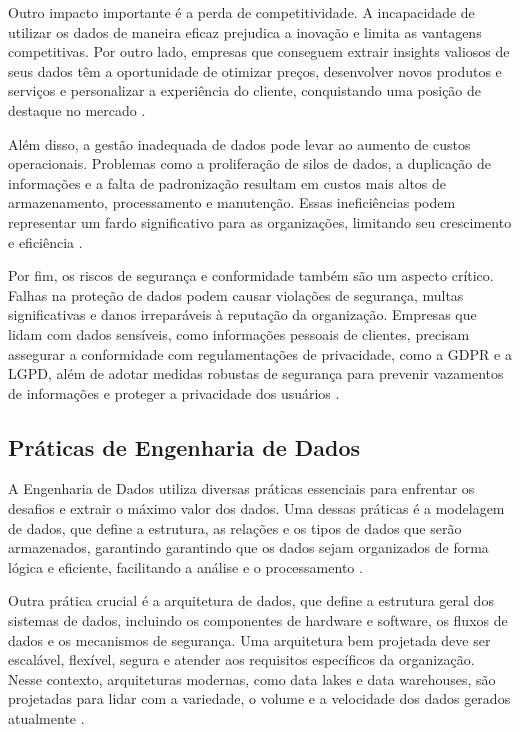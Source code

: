 Outro impacto importante é a perda de competitividade. A incapacidade de utilizar os dados de maneira eficaz prejudica 
a inovação e limita as vantagens competitivas. Por outro lado, empresas que conseguem extrair insights valiosos de 
seus dados têm a oportunidade de otimizar preços, desenvolver novos produtos e serviços e personalizar a experiência 
do cliente, conquistando uma posição de destaque no mercado \cite{impact_poor_data_1998}.

Além disso, a gestão inadequada de dados pode levar ao aumento de custos operacionais. Problemas como a proliferação 
de silos de dados, a duplicação de informações e a falta de padronização resultam em custos mais altos de armazenamento, 
processamento e manutenção. Essas ineficiências podem representar um fardo significativo para as organizações, limitando 
seu crescimento e eficiência \cite{impact_poor_data_1998}.

Por fim, os riscos de segurança e conformidade também são um aspecto crítico. Falhas na proteção de dados podem causar 
violações de segurança, multas significativas e danos irreparáveis à reputação da organização. Empresas que lidam com 
dados sensíveis, como informações pessoais de clientes, precisam assegurar a conformidade com regulamentações de 
privacidade, como a GDPR e a LGPD, além de adotar medidas robustas de segurança para prevenir vazamentos de informações e 
proteger a privacidade dos usuários \cite{benfeldt2020data}.

\subsection{Práticas de Engenharia de Dados}
A Engenharia de Dados utiliza diversas práticas essenciais para enfrentar os desafios e extrair o máximo valor 
dos dados. Uma dessas práticas é a modelagem de dados, que define a estrutura, as relações e os tipos de dados 
que serão armazenados, garantindo garantindo que os dados sejam organizados de forma lógica e eficiente, 
facilitando a análise e o processamento \cite{volk2019challenging}.

Outra prática crucial é a arquitetura de dados, que define a estrutura geral dos sistemas de dados, incluindo os 
componentes de hardware e software, os fluxos de dados e os mecanismos de segurança. Uma arquitetura bem projetada 
deve ser escalável, flexível, segura e atender aos requisitos específicos da organização. Nesse contexto, arquiteturas 
modernas, como data lakes e data warehouses, são projetadas para lidar com a variedade, o volume e a velocidade dos 
dados gerados atualmente \cite{volk2019challenging}.

